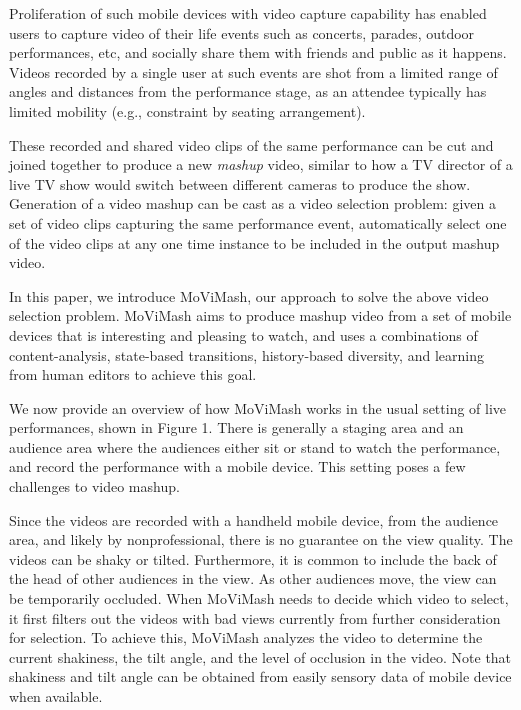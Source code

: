 \documentclass{sig-alternate-05-2015}
\begin{document}
Proliferation of such mobile devices with video capture capability has enabled users to capture video of their life events such
as concerts, parades, outdoor performances, etc, and socially share
them with friends and public as it happens. Videos recorded by
a single user at such events are shot from a limited range of angles and distances from the performance stage, as an attendee typically has limited mobility (e.g., constraint by seating arrangement). 

These recorded and shared video clips of the same performance
can be cut and joined together to produce a new \textit{mashup} video,
similar to how a TV director of a live TV show would switch between different cameras to produce the show. Generation of a video
mashup can be cast as a video selection problem: given a set of
video clips capturing the same performance event, automatically
select one of the video clips at any one time instance to be included
in the output mashup video.

In this paper, we introduce MoViMash, our approach to solve
the above video selection problem. MoViMash aims to produce
mashup video from a set of mobile devices that is interesting and
pleasing to watch, and uses a combinations of content-analysis,
state-based transitions, history-based diversity, and learning from
human editors to achieve this goal.

We now provide an overview of how MoViMash works in the
usual setting of live performances, shown in Figure 1. There is
generally a staging area and an audience area where the audiences
either sit or stand to watch the performance, and record the performance with a mobile device. This setting poses a few challenges to
video mashup.

Since the videos are recorded with a handheld mobile device,
from the audience area, and likely by nonprofessional, there is no
guarantee on the view quality. The videos can be shaky or tilted.
Furthermore, it is common to include the back of the head of other
audiences in the view. As other audiences move, the view can be
temporarily occluded. When MoViMash needs to decide which
video to select, it first filters out the videos with bad views currently
from further consideration for selection. To achieve this, MoViMash analyzes the video to determine the current shakiness, the tilt
angle, and the level of occlusion in the video. Note that shakiness and tilt angle can be obtained from easily sensory data of mobile
device when available.
\end{document}

